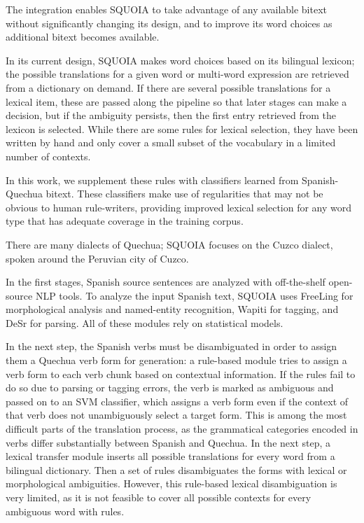 The integration enables SQUOIA to take advantage of any available bitext
without significantly changing its design, and to improve its word choices as
additional bitext becomes available.

In its current design, SQUOIA makes word choices based on its bilingual
lexicon; the possible translations for a given word or multi-word expression
are retrieved from a dictionary on demand. If there are several possible
translations for a lexical item, these are passed along the pipeline so
that later stages can make a decision, but if the ambiguity persists,
then the first entry retrieved from the lexicon is selected. While there are
some rules for lexical selection, they have been written by hand and only cover
a small subset of the vocabulary in a limited number of contexts.

In this work, we supplement these rules with classifiers learned from
Spanish-Quechua bitext.
These classifiers make use of regularities that may not
be obvious to human rule-writers, providing improved lexical selection for
any word type that has adequate coverage in the training corpus.

There are many dialects of Quechua; SQUOIA focuses on the
Cuzco dialect, spoken around the Peruvian city of Cuzco.

In the first stages, Spanish source sentences are analyzed with off-the-shelf
open-source NLP tools. To analyze the input Spanish text,
SQUOIA uses FreeLing \cite{padro12} for morphological analysis and named-entity
recognition,
Wapiti \cite{lavergne2010practical} for tagging,
and DeSr \cite{attardi-EtAl:2007:EMNLP-CoNLL2007} for parsing.
All of these modules rely on statistical models.

In the next step, the Spanish verbs must be disambiguated in order to assign
them a Quechua verb form for generation: a rule-based module tries to assign a
verb form to each verb chunk based on contextual information. If the rules fail to
do so due to parsing or tagging errors, the verb is marked as ambiguous and
passed on to an SVM classifier, which assigns a verb form even if the context
of that verb does not unambiguously select a target form. This is among the
most difficult parts of the
translation process, as the grammatical categories encoded in verbs differ
substantially between Spanish and Quechua. In the next step, a lexical transfer
module inserts all possible translations for every word from a bilingual dictionary.
Then a set of rules disambiguates the forms with lexical or morphological
ambiguities. However, this rule-based lexical disambiguation is very limited,
as it is not feasible to cover all possible contexts for every ambiguous word
with rules.

